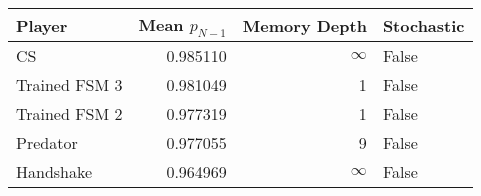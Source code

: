 \begin{tabular}{lrrl}
\toprule
        Player &  Mean $p_{N-1}$ &  Memory Depth & Stochastic \\
\midrule
            CS &        0.985110 &            \(\infty\) &      False \\
 Trained FSM 3 &        0.981049 &             1 &      False \\
 Trained FSM 2 &        0.977319 &             1 &      False \\
      Predator &        0.977055 &             9 &      False \\
     Handshake &        0.964969 &            \(\infty\) &      False \\
\bottomrule
\end{tabular}
